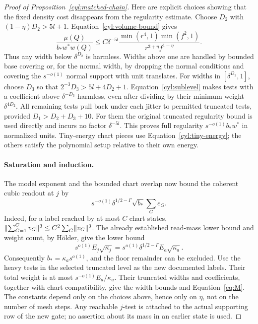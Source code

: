 \begin{proof}[Proof of Proposition~\ref{cyl:matched-chain}]
Here are explicit choices showing that the fixed density cost disappears
from the regularity estimate.  Choose $D_2$ with
$(1-\eta)D_2>5l+1$.  Equation~\eqref{cyl:volume-bound} gives
\[
 \frac{\mu(Q)}{b_*w^*w(Q)}
 \le C\delta^{-5l}
 \frac{\min(r^4,1)\min(f^2,1)}{r^{3+\eta}f^{1-\eta}}.
\]
Thus any width below $\delta^{D_2}$ is harmless.  Widths above one are
handled by bounded base covering or, for the normal width, by dropping
the normal conditions and covering the $s^{-o(1)}$ normal support with
unit translates.  For widths in $[\delta^{D_2},1]$, choose $D_3$ so
that $2^{-3}D_3>5l+4D_2+1$.  Equation~\eqref{cyl:sublevel} makes tests
with a coefficient above $\delta^{-D_3}$ harmless, even after dividing
by their minimum weight $\delta^{4D_2}$.  All remaining tests pull back
under each jitter to permitted truncated tests, provided
$D_1>D_2+D_3+10$.  For them the original truncated regularity bound is
used directly and incurs no factor $\delta^{-5l}$.
This proves full regularity $s^{-o(1)}b_*w^*$ in normalized units.
Tiny-energy chart pieces use Equation~\eqref{cyl:tiny-energy}; the others
satisfy the polynomial setup relative to their own energy.

\paragraph{Saturation and induction.}
The model exponent and the bounded chart overlap now bound the coherent
cubic readout at $j$ by
\begin{equation}\label{cyl:chart-upper}
 s^{-o(1)}\delta^{1/2-\Gamma}\sqrt{b_*}\sum_Ge_G.
\end{equation}
Indeed, for a label reached by at most $C$ chart states,
$\lVert \sum_{G=1}^Cv_G\rVert^3\le C^2\sum_G\lVert v_G\rVert^3$.
The already established read-mass lower bound and weight count, by
H\"older, give the lower bound
\[
 s^{o(1)}E_j\sqrt{\kappa_j}
  =s^{o(1)}\delta^{1/2-\Gamma}E_a\sqrt{\kappa_a}.
\]
Consequently $b_*=\kappa_a s^{o(1)}$, and the floor remainder can be
excluded.  Use the heavy tests in the selected truncated level as the
new documented labels.  Their total weight is at most
$s^{-o(1)}E_a/\kappa_a$.  Their truncated widths and coefficients,
together with chart compatibility, give the width bounds and
Equation~\eqref{eq:M}.  The constants depend only on the choices above,
hence only on $\eta$, not on the number of mesh steps.  Any reachable
$j$-test is attached to the actual supporting row of the new gate; no
assertion about its mass in an earlier state is used.


\end{proof}
